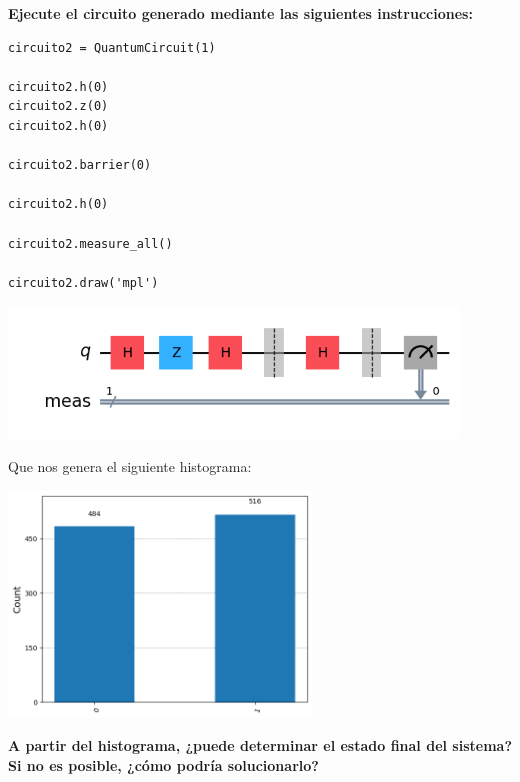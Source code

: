 \textbf{Ejecute el circuito generado mediante las siguientes instrucciones:}\vspace{.2cm}

\begin{verbatim}
circuito2 = QuantumCircuit(1)

circuito2.h(0)
circuito2.z(0)
circuito2.h(0)

circuito2.barrier(0)

circuito2.h(0)

circuito2.measure_all()

circuito2.draw('mpl')
\end{verbatim}

\begin{center}
    \includegraphics[height=3.5cm]{src/Img/2.png}
\end{center}

Que nos genera el siguiente histograma: 

\begin{center}
    \includegraphics[height=6cm]{src/Img/2.1.png}
\end{center}

\textbf{A partir del histograma, ¿puede determinar el estado final del sistema? Si no es posible, ¿cómo podría solucionarlo?} \vspace{.2cm}

